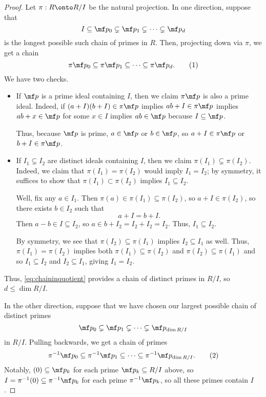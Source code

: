 \begin{proof}
	Let $\pi:R\onto R/I$ be the natural projection. In one direction, suppose that
	\[I\subseteq\mf p_0\subsetneq\mf p_1\subsetneq\cdots\subsetneq\mf p_d\]
	is the longest possible such chain of primes in $R$. Then, projecting down via $\pi$, we get a chain
	\[\pi\mf p_0\subseteq\pi\mf p_1\subseteq\cdots\subseteq\pi\mf p_d.\tag{1}\label{eq:chaininquotient}\]
	We have two checks.
	\begin{itemize}
		\item If $\mf p$ is a prime ideal containing $I$, then we claim $\pi\mf p$ is also a prime ideal. Indeed, if $(a+I)(b+I)\in\pi\mf p$ implies $ab+I\in\pi\mf p$ implies $ab+x\in\mf p$ for some $x\in I$ implies $ab\in\mf p$ because $I\subseteq\mf p$.
		
		Thus, because $\mf p$ is prime, $a\in\mf p$ or $b\in\mf p$, so $a+I\in\pi\mf p$ or $b+I\in\pi\mf p$.

		\item If $I_1\subsetneq I_2$ are distinct ideals containing $I$, then we claim $\pi(I_1)\subsetneq\pi(I_2)$. Indeed, we claim that $\pi(I_1)=\pi(I_2)$ would imply $I_1=I_2$; by symmetry, it suffices to show that $\pi(I_1)\subset\pi(I_2)$ implies $I_1\subseteq I_2$.

		Well, fix any $a\in I_1$. Then $\pi(a)\in\pi(I_1)\subseteq\pi(I_2)$, so $a+I\in\pi(I_2)$, so there exists $b\in I_2$ such that
		\[a+I=b+I.\]
		Then $a-b\in I\subseteq I_2$, so $a\in b+I_2=I_2+I_2=I_2$. Thus, $I_1\subseteq I_2$.

		By symmetry, we see that $\pi(I_2)\subseteq\pi(I_1)$ implies $I_2\subseteq I_1$ as well. Thus, $\pi(I_1)=\pi(I_2)$ implies both $\pi(I_1)\subseteq\pi(I_2)$ and $\pi(I_2)\subseteq\pi(I_1)$ and so $I_1\subseteq I_2$ and $I_2\subseteq I_1$, giving $I_1=I_2$.
	\end{itemize}
	Thus, \autoref{eq:chaininquotient} provides a chain of distinct primes in $R/I$, so $d\le\dim R/I$.

	In the other direction, suppose that we have chosen our largest possible chain of distinct primes
	\[\mf p_0\subsetneq\mf p_1\subsetneq\cdots\subsetneq\mf p_{\dim R/I}\]
	in $R/I$. Pulling backwards, we get a chain of primes
	\[\pi^{-1}\mf p_0\subseteq\pi^{-1}\mf p_1\subseteq\cdots\subseteq\pi^{-1}\mf p_{\dim R/I}.\tag{2}\label{eq:chainabovei}\]
	Notably, $(0)\subseteq\mf p_k$ for each prime $\mf p_k\subseteq R/I$ above, so $I=\pi^{-1}(0)\subseteq\pi^{-1}\mf p_k$ for each prime $\pi^{-1}\mf p_k$, so all these primes contain $I$.


\end{proof}
